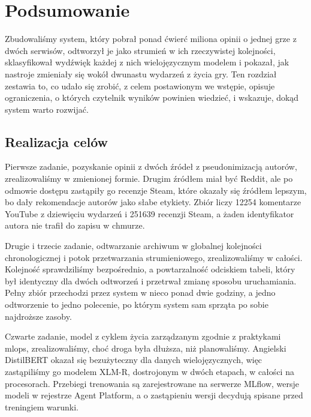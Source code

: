 \chapter{Podsumowanie}
\label{chap:summary}


Zbudowaliśmy system, który pobrał ponad ćwierć miliona opinii o jednej grze z dwóch serwisów, odtworzył je jako strumień w ich rzeczywistej kolejności, sklasyfikował wydźwięk każdej z nich wielojęzycznym modelem i pokazał, jak nastroje zmieniały się wokół dwunastu wydarzeń z życia gry.
Ten rozdział zestawia to, co udało się zrobić, z celem postawionym we wstępie, opisuje ograniczenia, o których czytelnik wyników powinien wiedzieć, i wskazuje, dokąd system warto rozwijać.

\section{Realizacja celów}
\label{sec:summary-goals}

Pierwsze zadanie, pozyskanie opinii z dwóch źródeł z pseudonimizacją autorów, zrealizowaliśmy w zmienionej formie.
Drugim źródłem miał być Reddit, ale po odmowie dostępu zastąpiły go recenzje Steam, które okazały się źródłem lepszym, bo dały rekomendacje autorów jako słabe etykiety.
Zbiór liczy \num{12254} komentarze YouTube z dziewięciu wydarzeń i \num{251639} recenzji Steam, a żaden identyfikator autora nie trafił do zapisu w chmurze.

Drugie i trzecie zadanie, odtwarzanie archiwum w globalnej kolejności chronologicznej i potok przetwarzania strumieniowego, zrealizowaliśmy w całości.
Kolejność sprawdziliśmy bezpośrednio, a powtarzalność odciskiem tabeli, który był identyczny dla dwóch odtworzeń i przetrwał zmianę sposobu uruchamiania.
Pełny zbiór przechodzi przez system w nieco ponad dwie godziny, a jedno odtworzenie to jedno polecenie, po którym system sam sprząta po sobie najdroższe zasoby.

Czwarte zadanie, model z cyklem życia zarządzanym zgodnie z praktykami \ac{mlops}, zrealizowaliśmy, choć droga była dłuższa, niż planowaliśmy.
Angielski DistilBERT okazał się bezużyteczny dla danych wielojęzycznych, więc zastąpiliśmy go modelem XLM-R, dostrojonym w dwóch etapach, w całości na procesorach.
Przebiegi trenowania są zarejestrowane na serwerze MLflow, wersje modeli w rejestrze Agent Platform, a o zastąpieniu wersji decydują spisane przed treningiem warunki.

